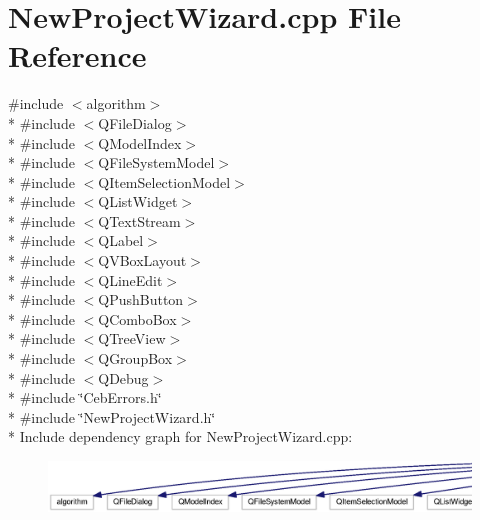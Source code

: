 \section{New\-Project\-Wizard.\-cpp File Reference}
\label{_new_project_wizard_8cpp}
{\ttfamily \#include $<$algorithm$>$}\\*
{\ttfamily \#include $<$Q\-File\-Dialog$>$}\\*
{\ttfamily \#include $<$Q\-Model\-Index$>$}\\*
{\ttfamily \#include $<$Q\-File\-System\-Model$>$}\\*
{\ttfamily \#include $<$Q\-Item\-Selection\-Model$>$}\\*
{\ttfamily \#include $<$Q\-List\-Widget$>$}\\*
{\ttfamily \#include $<$Q\-Text\-Stream$>$}\\*
{\ttfamily \#include $<$Q\-Label$>$}\\*
{\ttfamily \#include $<$Q\-V\-Box\-Layout$>$}\\*
{\ttfamily \#include $<$Q\-Line\-Edit$>$}\\*
{\ttfamily \#include $<$Q\-Push\-Button$>$}\\*
{\ttfamily \#include $<$Q\-Combo\-Box$>$}\\*
{\ttfamily \#include $<$Q\-Tree\-View$>$}\\*
{\ttfamily \#include $<$Q\-Group\-Box$>$}\\*
{\ttfamily \#include $<$Q\-Debug$>$}\\*
{\ttfamily \#include \char`\"{}Ceb\-Errors.\-h\char`\"{}}\\*
{\ttfamily \#include \char`\"{}New\-Project\-Wizard.\-h\char`\"{}}\\*
Include dependency graph for New\-Project\-Wizard.\-cpp\-:
\nopagebreak
\begin{figure}[H]
\begin{center}
\leavevmode
\includegraphics[width=350pt]{_new_project_wizard_8cpp__incl}
\end{center}
\end{figure}
